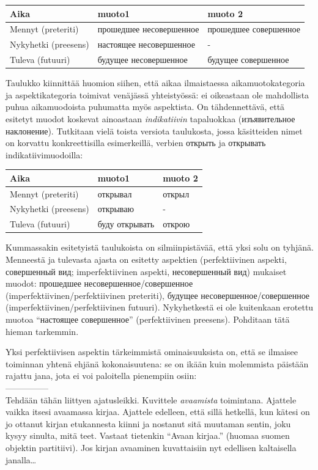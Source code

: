 \documentclass[]{scrartcl}
\begin{document}
\begin{longtable}[c]{@{}lll@{}}
\toprule
Aika & muoto1 & muoto 2\tabularnewline
\midrule
\endhead
Mennyt (preteriti) & прошедшее несовершенное & прошедшее
совершенное\tabularnewline
Nykyhetki (preesens) & настоящее несовершенное & -\tabularnewline
Tuleva (futuuri) & будущее несовершенное & будущее
совершенное\tabularnewline
\bottomrule
\end{longtable}

Taulukko kiinnittää huomion siihen, että aikaa ilmaistaessa
aikamuotokategoria ja aspektikategoria toimivat venäjässä yhteistyössä:
ei oikeastaan ole mahdollista puhua aikamuodoista puhumatta myös
aspektista. On tähdennettävä, että esitetyt muodot koskevat ainoastaan
\emph{indikatiivin} tapaluokkaa (изъявительное наклонение). Tutkitaan
vielä toista versiota taulukosta, jossa käsitteiden nimet on korvattu
konkreettisilla esimerkeillä, verbien открыть ja открывать
indikatiivimuodoilla:

\begin{longtable}[c]{@{}lll@{}}
\toprule
Aika & muoto1 & muoto 2\tabularnewline
\midrule
\endhead
Mennyt (preteriti) & открывал & открыл\tabularnewline
Nykyhetki (preesens) & открываю & -\tabularnewline
Tuleva (futuuri) & буду открывать & открою\tabularnewline
\bottomrule
\end{longtable}

Kummassakin esitetyistä taulukoista on silmiinpistävää, että yksi solu
on tyhjänä. Menneestä ja tulevasta ajasta on esitetty aspektien
(perfektiivinen aspekti, совершенный вид; imperfektiivinen aspekti,
несовершенный вид) mukaiset muodot: прошедшее несовершенное/совершенное
(imperfektiivinen/perfektiivinen preteriti), будущее
несовершенное/совершенное (imperfektiivinen/perfektiivinen futuuri).
Nykyhetkestä ei ole kuitenkaan erotettu muotoa ``настоящее совершенное''
(perfektiivinen preesens). Pohditaan tätä hieman tarkemmin.

Yksi perfektiivisen aspektin tärkeimmistä ominaisuuksista on, että se
ilmaisee toiminnan yhtenä ehjänä kokonaisuutena: se on ikään kuin
molemmista päistään rajattu jana, jota ei voi paloitella pienempiin
osiin:\\

\textbar{}---------------\textbar{}\\

Tehdään tähän liittyen ajatusleikki. Kuvittele \emph{avaamista}
toimintana. Ajattele vaikka itsesi avaamassa kirjaa.
Ajattele edelleen, että sillä hetkellä, kun kätesi on jo ottanut kirjan
etukannesta kiinni ja nostanut sitä muutaman sentin, joku kysyy sinulta,
mitä teet. Vastaat tietenkin ``Avaan kirjaa.'' (huomaa suomen objektin
partitiivi). Jos kirjan avaaminen kuvattaisiin nyt edellisen kaltaisella
janalla\ldots{}\\
\end{document}
